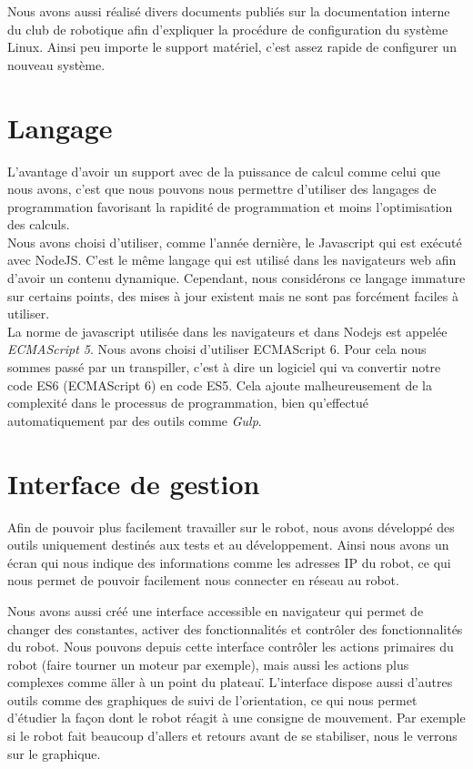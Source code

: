 	Nous avons aussi réalisé divers documents publiés sur la documentation interne du club de robotique afin d'expliquer la procédure de configuration du système Linux. Ainsi peu importe le support matériel, c'est assez rapide de configurer un nouveau système.

	\section{Langage}
	L'avantage d'avoir un support avec de la puissance de calcul comme celui que nous avons, c'est que nous pouvons nous permettre d'utiliser des langages de programmation favorisant la rapidité de programmation et moins l'optimisation des calculs.\\

	Nous avons choisi d'utiliser, comme l'année dernière, le Javascript qui est exécuté avec NodeJS. C'est le même langage qui est utilisé dans les navigateurs web afin d'avoir un contenu dynamique. Cependant, nous considérons ce langage immature sur certains points, des mises à jour existent mais ne sont pas forcément faciles à utiliser.\\

	La norme de javascript utilisée dans les navigateurs et dans Nodejs est appelée \textit{ECMAScript 5}. Nous avons choisi d'utiliser ECMAScript 6. Pour cela nous sommes passé par un transpiller, c'est à dire un logiciel qui va convertir notre code ES6 (ECMAScript 6) en code ES5. Cela ajoute malheureusement de la complexité dans le processus de programmation, bien qu'effectué automatiquement par des outils comme \textit{Gulp}.

	\section{Interface de gestion}
	Afin de pouvoir plus facilement travailler sur le robot, nous avons développé des outils uniquement destinés aux tests et au développement. Ainsi nous avons un écran qui nous indique des informations comme les adresses IP du robot, ce qui nous permet de pouvoir facilement nous connecter en réseau au robot.

	Nous avons aussi créé une interface accessible en navigateur qui permet de changer des constantes, activer des fonctionnalités et contrôler des fonctionnalités du robot. Nous pouvons depuis cette interface contrôler les actions primaires du robot (faire tourner un moteur par exemple), mais aussi les actions plus complexes comme \"aller à un point du plateau\". L'interface dispose aussi d'autres outils comme des graphiques de suivi de l'orientation, ce qui nous permet d'étudier la façon dont le robot réagit à une consigne de mouvement. Par exemple si le robot fait beaucoup d'allers et retours avant de se stabiliser, nous le verrons sur le graphique.


